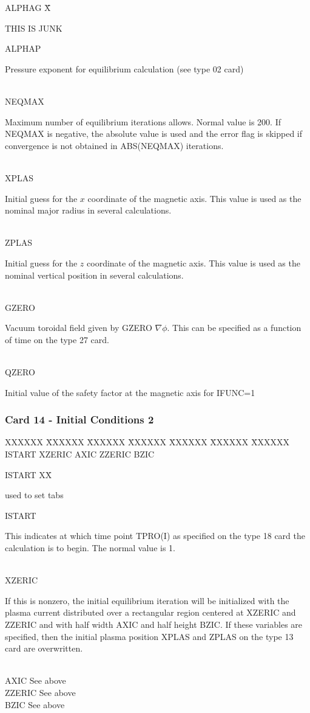 \begin{tabbing}
ALPHAG \= X\= \parbox[t]{\width}{THIS IS JUNK} \kill
ALPHAP \> \>\parbox[t]{\width}{Pressure exponent for equilibrium calculation (see type 02
card)}\\
NEQMAX \> \> \parbox[t]{\width}{Maximum number of equilibrium iterations allows. Normal
value is 200.  If NEQMAX is negative, the absolute value is used and the error flag is skipped
if convergence is not obtained in ABS(NEQMAX) iterations.}\\
XPLAS \> \> \parbox[t]{\width}{Initial guess for the $x$ coordinate of the magnetic axis.
This value is used as the nominal major radius in several calculations.} \\
ZPLAS \> \>\parbox[t]{\width}{Initial guess for the $z$ coordinate of the magnetic axis.
This value is used as the nominal vertical position in several calculations.} \\
GZERO \> \>\parbox[t]{\width}{Vacuum toroidal field given by GZERO $\nabla \phi$.  This can be specified
 as a function of time on the type 27 card.} \\
QZERO \> \>\parbox[t]{\width}{Initial value of the safety factor at the magnetic axis for
IFUNC=1}
\end{tabbing}
\newpage \subsubsection{Card 14 - Initial Conditions 2}
\begin{tabbing}
XXXXXX \= XXXXXX \= XXXXXX \= XXXXXX \= XXXXXX \= XXXXXX \=
XXXXXX      \\
\footnotesize ISTART \>\footnotesize XZERIC \>\footnotesize AXIC \>\footnotesize ZZERIC
\>\footnotesize BZIC 
\end{tabbing}
\begin{tabbing}
ISTART XX\= \parbox[t]{\width}{used to set tabs} \kill
ISTART \> \parbox[t]{\width}{This indicates at which time point TPRO(I) as specified on the
type 18 card the calculation is to begin.  The normal value is 1.} \\
XZERIC \>\parbox[t]{\width}{If this is nonzero, the initial equilibrium iteration will be initialized
with the plasma current distributed over a rectangular region centered at XZERIC and ZZERIC
and with half width AXIC and half height BZIC.  If these variables are specified, then the initial
plasma position XPLAS and ZPLAS on the type 13 card are overwritten.}\\
AXIC \> See above\\
ZZERIC \> See above\\
BZIC \> See above
\end{tabbing}

